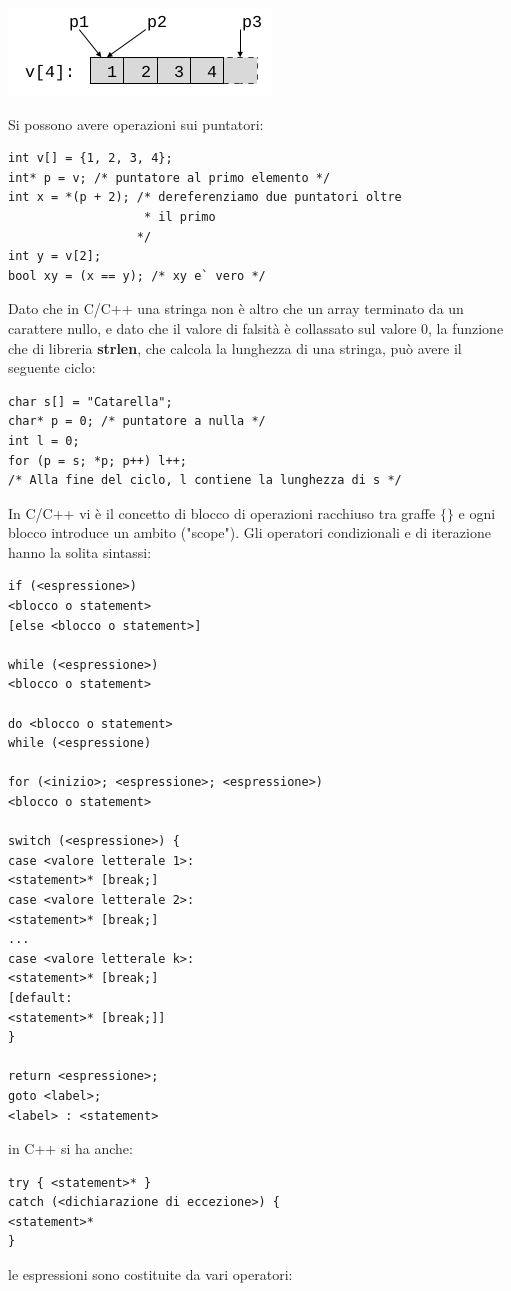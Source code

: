 \documentclass[a4paper,12pt, oneside]{book}
\begin{document}
	\begin{center}
		\includegraphics[scale=3]{img/c3.png}
	\end{center}
	Si possono avere operazioni sui puntatori:
	\begin{verbatim}
int v[] = {1, 2, 3, 4};
int* p = v; /* puntatore al primo elemento */
int x = *(p + 2); /* dereferenziamo due puntatori oltre
                   * il primo
                  */
int y = v[2];
bool xy = (x == y); /* xy e` vero */
\end{verbatim}
	Dato che in C/C++ una stringa non è altro che un array
	terminato da un carattere nullo, e dato che il valore di falsità è collassato sul valore 0, la funzione che di libreria \textbf{strlen}, che calcola la lunghezza di una stringa, può avere il seguente ciclo:
	\begin{verbatim}
char s[] = "Catarella";
char* p = 0; /* puntatore a nulla */
int l = 0;
for (p = s; *p; p++) l++;
/* Alla fine del ciclo, l contiene la lunghezza di s */
\end{verbatim}
	In C/C++ vi è il concetto di blocco di operazioni racchiuso tra graffe $\{\}$ e ogni blocco introduce un ambito ("scope"). Gli operatori condizionali e di iterazione hanno la solita sintassi:
	\begin{verbatim}
if (<espressione>)
<blocco o statement>
[else <blocco o statement>]

while (<espressione>)
<blocco o statement>

do <blocco o statement>
while (<espressione)

for (<inizio>; <espressione>; <espressione>)
<blocco o statement>

switch (<espressione>) {
case <valore letterale 1>:
<statement>* [break;]
case <valore letterale 2>:
<statement>* [break;]
...
case <valore letterale k>:
<statement>* [break;]
[default:
<statement>* [break;]]
}

return <espressione>;
goto <label>;
<label> : <statement>
\end{verbatim}
	in C++ si ha anche:
	\begin{verbatim}
try { <statement>* }
catch (<dichiarazione di eccezione>) {
<statement>*
}
\end{verbatim}
	\newpage
	le espressioni sono costituite da vari operatori:
\end{document}
